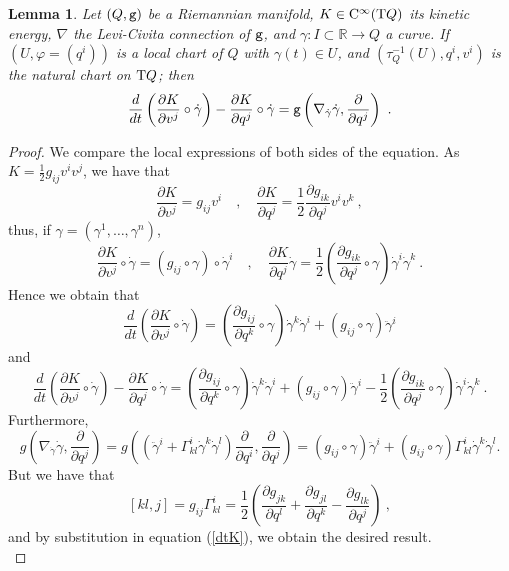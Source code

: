 \documentclass[12pt]{report}
\newtheorem{lem}[teor]{Lemma}
\def\beq{\begin{equation}}
\def\eeq{\end{equation}}
\def\derpar#1#2{\frac{\partial{#1}}{\partial{#2}}}
\def\qed{\ifvmode\removelastskip\fi
{\unskip\nobreak\hfil\penalty50\hbox{}\nobreak\hfil
\hbox{\vrule height1.2ex width1.2ex}\parfillskip=0pt
\finalhyphendemerits=0 \par\smallskip}}
\def\Real{\mathbb{R}}
\def\Tan{{\rm T}}
\def\Cinfty{{\rm C}^\infty}
\begin{document}
\begin{lem}
Let $(Q,{\tt g})$ be a Riemannian manifold, $K\in\Cinfty (\Tan Q)$ its kinetic energy, $\nabla$ the Levi-Civita connection of ${\tt g}$, and
$\gamma\colon I\subset\Real\to Q$ a curve.
If $(U,\varphi=(q^i))$ is a local chart of $Q$ with $\gamma(t)\in U$, and $(\tau_Q^{-1}(U),q^i,v^i)$
is the natural chart on $\Tan Q$; then
$$
\frac{d}{d t}\left(\derpar{K}{v^j}\circ\dot\gamma\right)-
\derpar{K}{q^j}\circ\dot\gamma=
{\tt g}\left(\nabla_{\dot\gamma}\dot\gamma,\derpar{}{q^j}\right) \ .
$$
\end{lem}
\begin{proof}
We compare the local expressions of both sides of the equation.
As $K=\frac{1}{2}g_{ij}v^iv^j$, we have that
$$
\derpar{K}{v^j}=g_{ij}v^i \quad ,\quad
\derpar{K}{q^j}=\frac{1}{2}\derpar{g_{ik}}{q^j}v^iv^k \ ,
$$
thus, if $\gamma=(\gamma^1,\ldots ,\gamma^n)$,
$$
\derpar{K}{v^j}\circ\dot\gamma=(g_{ij}\circ\gamma)\circ\dot\gamma^i \quad ,\quad
\derpar{K}{q^j}\dot\gamma=
\frac{1}{2}\left(\derpar{g_{ik}}{q^j}\circ\gamma\right)\dot\gamma^i\dot\gamma^k \ .
$$
Hence we obtain that
$$
\frac{d}{d t}\left(\derpar{K}{v^j}\circ\dot\gamma\right)=
\left(\derpar{g_{ij}}{q^k}\circ\gamma\right)\dot\gamma^k\dot\gamma^i+
(g_{ij}\circ\gamma)\ddot\gamma^i
$$
and
\beq
\frac{d}{d t}\left(\derpar{K}{v^j}\circ\dot\gamma\right)-
\derpar{K}{q^j}\circ\dot\gamma=
\left(\derpar{g_{ij}}{q^k}\circ\gamma\right)\dot\gamma^k\dot\gamma^i+
(g_{ij}\circ\gamma)\ddot\gamma^i-
\frac{1}{2}\left(\derpar{g_{ik}}{q^j}\circ\gamma\right)\dot\gamma^i\dot\gamma^k \ . \label{dtK}
\eeq
Furthermore,
$$
g\left(\nabla_{\dot\gamma}\dot\gamma,\derpar{}{q^j}\right)=
g\left((\ddot\gamma^{i}+\Gamma^i_{kl}\dot\gamma^k\dot\gamma^l)\derpar{}{q^i},\derpar{}{q^j}\right)=
(g_{ij}\circ\gamma)\ddot\gamma^i+
(g_{ij}\circ\gamma)\Gamma^i_{kl}\dot\gamma^k\dot\gamma^l.
$$
But we have that
$$
[kl,j]=g_{ij}\Gamma^i_{kl}=
\frac{1}{2}\left(\derpar{g_{jk}}{q^l}+\derpar{g_{jl}}{q^k}-\derpar{g_{lk}}{q^j}\right) \ ,
$$
and by substitution in equation (\ref{dtK}), we obtain the desired result.
\\ \qed \end{proof}
\end{document}
